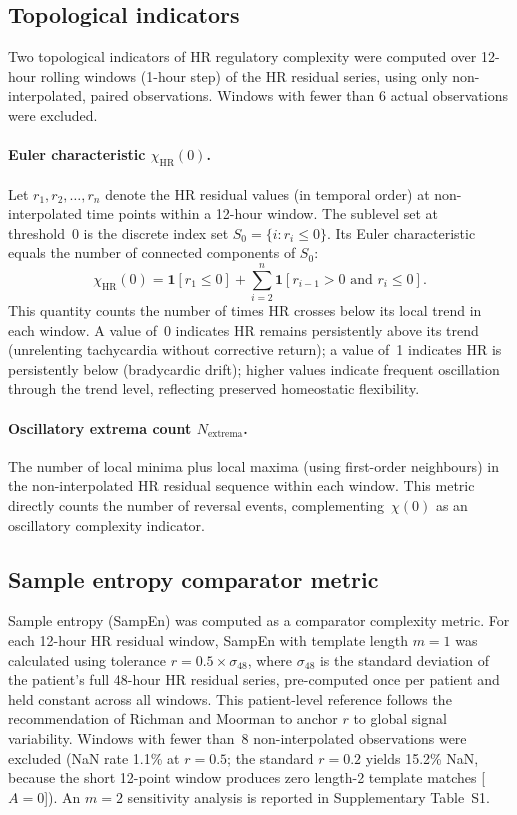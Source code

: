\documentclass[12pt,a4paper]{article}
\begin{document}
\subsection{Topological indicators}
\label{sec:topo}

Two topological indicators of HR regulatory complexity were computed over
12-hour rolling windows (1-hour step) of the HR residual series,
using only non-interpolated, paired observations.
Windows with fewer than 6 actual observations were excluded.

\paragraph{Euler characteristic $\chi_{\text{HR}}(0)$.}
Let $r_1, r_2, \ldots, r_n$ denote the HR residual values (in temporal order)
at non-interpolated time points within a 12-hour window.
The sublevel set at threshold~0 is the discrete index set
$S_0 = \{i : r_i \leq 0\}$.
Its Euler characteristic equals the number of connected components of $S_0$:
\begin{equation}
  \chi_{\text{HR}}(0)
  = \mathbf{1}[r_1 \leq 0]
    + \sum_{i=2}^{n} \mathbf{1}[r_{i-1} > 0 \text{ and } r_i \leq 0].
  \label{eq:euler}
\end{equation}
This quantity counts the number of times HR crosses below its local trend
in each window.
A value of~0 indicates HR remains persistently above its trend (unrelenting
tachycardia without corrective return); a value of~1 indicates HR is
persistently below (bradycardic drift); higher values indicate frequent
oscillation through the trend level, reflecting preserved homeostatic
flexibility.

\paragraph{Oscillatory extrema count $N_{\text{extrema}}$.}
The number of local minima plus local maxima (using first-order neighbours)
in the non-interpolated HR residual sequence within each window.
This metric directly counts the number of reversal events,
complementing~$\chi(0)$ as an oscillatory complexity indicator.

\subsection{Sample entropy comparator metric}
\label{sec:sampen-method}

Sample entropy (SampEn) was computed as a comparator complexity metric.
For each 12-hour HR residual window, SampEn with template length $m=1$
was calculated using tolerance $r = 0.5 \times \sigma_{48}$, where
$\sigma_{48}$ is the standard deviation of the patient's full 48-hour
HR residual series, pre-computed once per patient and held constant
across all windows.
This patient-level reference follows the recommendation of Richman and
Moorman \cite{richman2000} to anchor $r$ to global signal variability.
Windows with fewer than~8 non-interpolated observations were excluded
(NaN rate 1.1\% at $r=0.5$; the standard $r=0.2$ yields 15.2\% NaN,
because the short 12-point window produces zero length-2 template
matches [$A=0$]).
An $m=2$ sensitivity analysis is reported in Supplementary Table~S1.
\end{document}
